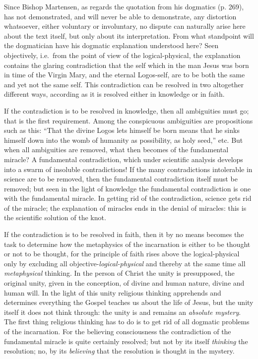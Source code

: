 \documentclass[12pt]{book}
\newcommand{\opage}[1]{\marginnote{\footnotesize\textit{[#1]}}}
\begin{document}
Since Bishop Martensen, as regards the quotation from his dogmatics (p. 269), has not demonstrated, and will never be able to demonstrate, any distortion whatsoever, either voluntary or involuntary, no dispute can naturally arise here about the text itself, but only about its interpretation. From what standpoint will the dogmatician have his dogmatic explanation understood here? Seen objectively, i.e.\ from the point of view of the logical-physical, the explanation contains the
\opage{89}\setcounter{footnote}{0}%
glaring contradiction that the self which in the man Jesus was born in time of the Virgin Mary, and the eternal Logos-self, are to be both the same and yet not the same self. This contradiction can be resolved in two altogether different ways, according as it is resolved either in knowledge or in faith.

If the contradiction is to be resolved in knowledge, then all ambiguities must go; that is the first requirement. Among the conspicuous ambiguities are propositions such as this: ``That the divine Logos lets himself be born means that he sinks himself down into the womb of humanity as possibility, as holy seed,'' etc. But when all ambiguities are removed, what then becomes of the fundamental miracle? A fundamental contradiction, which under scientific analysis develops into a swarm of insoluble contradictions! If the many contradictions intolerable in science are to be removed, then the fundamental contradiction itself must be removed; but seen in the light of knowledge the fundamental contradiction is one with the fundamental miracle. In getting rid of the contradiction, science gets rid of the miracle; the explanation of miracles ends in the denial of miracles: this is the scientific solution of the knot.

If the contradiction is to be resolved in faith, then it by no means becomes the task to determine how the metaphysics of the incarnation is either to be thought or not to be thought, for the principle of faith rises above the logical-physical only by excluding all objective-\emph{logical-physical} and thereby at the same time all \emph{metaphysical} thinking. In the person of Christ the unity is presupposed, the original unity, given in the conception, of divine and human nature, divine and human will. In the light of this unity religious thinking apprehends and determines everything the Gospel teaches us about the life of Jesus, but the unity itself it does not think through: the unity is and remains an \emph{absolute mystery}. The first thing religious thinking has to do is to get rid of all dogmatic problems of the incarnation. For the believing
\opage{90}\setcounter{footnote}{0}%
consciousness the contradiction of the fundamental miracle is quite certainly resolved; but not by its itself \emph{thinking} the resolution; no, by its \emph{believing} that the resolution is thought in the mystery.
\end{document}
